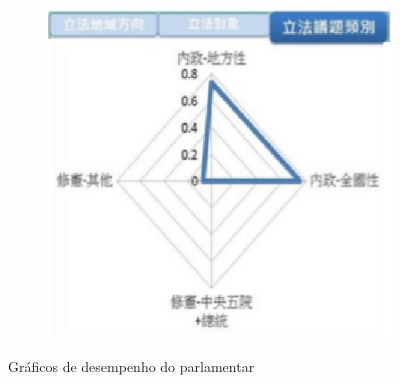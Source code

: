 \begin{figure}[h]
\begin{subfigure}{.3\textwidth}
  \end{subfigure}
  \begin{subfigure}{.3\textwidth}
    \centering
    \includegraphics[scale=0.3]{figuras/aspecto3.eps}
  \end{subfigure}
  \caption{Gráficos de desempenho do parlamentar}
\end{figure}
